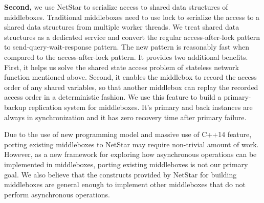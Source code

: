 
\textbf{Second,} we use NetStar to serialize access to shared data structures of middleboxes. Traditional middleboxes need to use lock to serialize the access to a shared data structures from multiple worker threads. We treat shared data structures as a dedicated service and convert the regular access-after-lock pattern to send-query-wait-response pattern. The new pattern is reasonably fast when compared to the access-after-lock pattern. It provides two additional benefits. First, it helps us solve the shared state access problem of stateless network function mentioned above. Second, it enables the middlebox to record the access order of any shared variables, so that another middlebox can replay the recorded access order in a deterministic fashion. We use this feature to build a primary-backup replication system for middleboxes. It's primary and back instances are always in synchronization and it has zero recovery time after primary failure.


Due to the use of new programming model and massive use of C++14 feature, porting existing middleboxes to NetStar may require non-trivial amount of work. However, as a new framework for exploring how asynchronous operations can be implemented in middleboxes, porting existing middleboxes is not our primary goal. We also believe that the constructs provided by NetStar for building middleboxes are general enough to implement other middleboxes that do not perform asynchronous operations.

